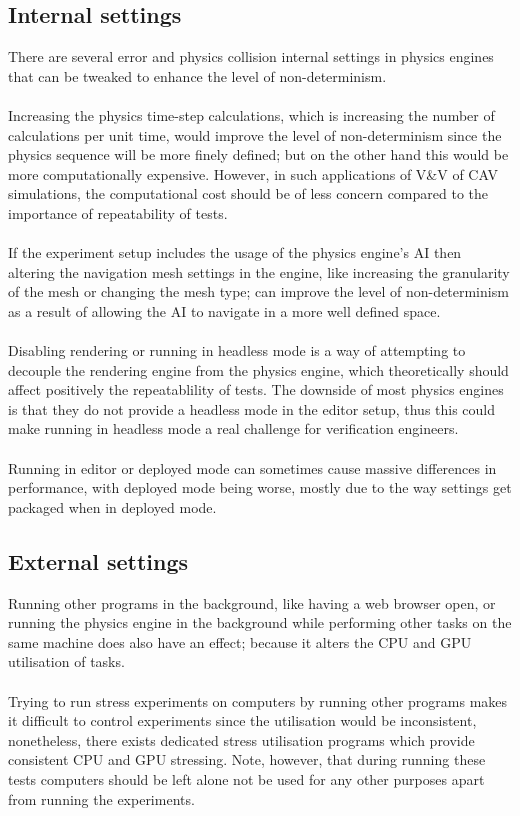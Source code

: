 \subsection{Internal settings}
\noindent There are several error and physics collision internal settings in physics engines that can be tweaked to enhance the level of non-determinism. \\\\
\noindent Increasing the physics time-step calculations, which is increasing the number of calculations per unit time, would improve the level of non-determinism since the physics sequence will be more finely defined; but on the other hand this would be more computationally expensive. However, in such applications of V\&V of CAV simulations, the computational cost should be of less concern compared to the importance of repeatability of tests. \\\\
\noindent If the experiment setup includes the usage of the physics engine's AI then altering the navigation mesh settings in the engine, like increasing the granularity of the mesh or changing the mesh type; can improve the level of non-determinism as a result of allowing the AI to navigate in a more well defined space.  \\\\
\noindent Disabling rendering or running in headless mode is a way of attempting to decouple the rendering engine from the physics engine, which theoretically should affect positively the repeatablility of tests. 
The downside of most physics engines is that they do not provide a headless mode in the editor setup, thus this could make running in headless mode a real challenge for verification engineers.  \\\\
\noindent Running in editor or deployed mode can sometimes cause massive differences in performance, with deployed mode being worse, mostly due to the way settings get packaged when in deployed mode.

\subsection{External settings}
\noindent Running other programs in the background, like having a web browser open, or running the physics engine in the background while performing other tasks on the same machine does also have an effect; because it alters the CPU and GPU utilisation of tasks.\\\\ 
\noindent Trying to run stress experiments on computers by running other programs makes it difficult to control experiments since the utilisation would be inconsistent, nonetheless, there exists dedicated stress utilisation programs which provide consistent CPU and GPU stressing. Note, however, that during running these tests computers should be left alone not be used for any other purposes apart from running the experiments.

